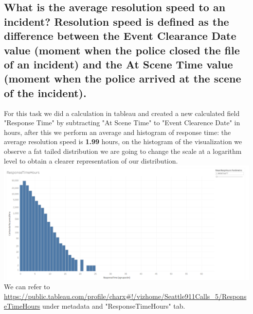 \documentclass{article}
\begin{document}
    \subsection{What is the	average	resolution speed to	an incident? Resolution	speed is defined	as the difference between the Event	Clearance Date value (moment when the police closed the file	of	an	incident) and the At Scene Time value (moment	when	the	police	arrived	at	the	scene of the incident).}
    For this task we did a calculation in tableau and created a new calculated field "Response Time" by subtracting "At Scene Time" to "Event Clearence Date" in hours, after this we perform an average and histogram of response time: the average resolution speed is \textbf{1.99} hours, on the histogram of the visualization we observe a fat tailed distribution we are going to change the scale at a logarithm level to obtain a clearer representation of our distribution.
    \\
    \includegraphics[width=\textwidth]{VisualAnalytics/Assignment2/images/ResponseTimeDist.PNG}
    \\
    We can refer to \url{https://public.tableau.com/profile/charx#!/vizhome/Seattle911Calls_5/ResponseTimeHours} under metadata and "ResponseTimeHours" tab.
    
\end{document}
